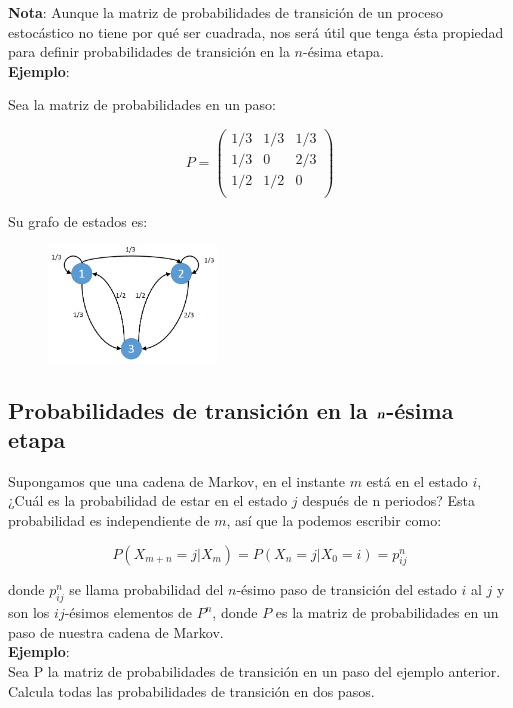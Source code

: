 \textbf{Nota}: Aunque la matriz de probabilidades de transición de un proceso estocástico no tiene por qué ser cuadrada, nos será útil que tenga ésta propiedad para definir probabilidades de transición en la $n$-ésima etapa.\\

\textbf{Ejemplo}:

Sea la matriz de probabilidades en un paso:

$$P=
\left(
\begin{array}{ccc}
1/3 & 1/3 & 1/3 \\
1/3 & 0 & 2/3 \\
1/2 & 1/2 & 0 \\
\end{array}
\right)
$$

Su grafo de estados es:

\begin{figure}[h]
	\centering
	\includegraphics[width=0.4\textwidth]{grafo1}
	\label{grf1}
\end{figure}



\subsection{Probabilidades de transición en la $\textbf{\textsl{n}}$-ésima etapa}

Supongamos que una cadena de Markov, en el instante $m$ está en el estado $i$, ¿Cuál es la probabilidad de estar en el estado $j$ después de n periodos? Esta probabilidad es independiente de $m$, así que la podemos escribir como:

$$
P(X_{m+n}=j|X_m)=P(X_n=j|X_0=i)=p_{ij}^n
$$

donde $p_{ij}^n$ se llama probabilidad del $n$-ésimo paso de transición del estado $i$ al $j$ y son los $ij$-ésimos elementos de $P^n$, donde $P$ es la matriz de probabilidades en un paso de nuestra cadena de Markov.\\


\textbf{Ejemplo}:\\ 

Sea P la matriz de probabilidades de transición en un paso del ejemplo anterior. Calcula todas las probabilidades de transición en dos pasos.


